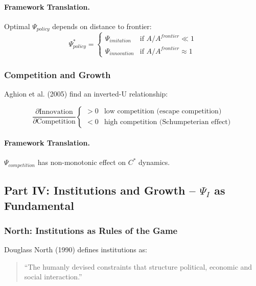 \paragraph{Framework Translation.}
Optimal $\Psi_{policy}$ depends on distance to frontier:
\begin{equation}
\Psi^*_{policy} = 
\begin{cases}
\Psi_{imitation} & \text{if } A/A^{frontier} \ll 1 \\
\Psi_{innovation} & \text{if } A/A^{frontier} \approx 1
\end{cases}
\end{equation}

\subsubsection{Competition and Growth}

Aghion et al. (2005) find an inverted-U relationship:

\begin{equation}
\frac{\partial \text{Innovation}}{\partial \text{Competition}} 
\begin{cases}
> 0 & \text{low competition (escape competition)} \\
< 0 & \text{high competition (Schumpeterian effect)}
\end{cases}
\end{equation}

\paragraph{Framework Translation.}
$\Psi_{competition}$ has non-monotonic effect on $C^*$ dynamics.

\subsection{Part IV: Institutions and Growth – $\Psi_I$ as Fundamental}

\subsubsection{North: Institutions as Rules of the Game}

Douglass North (1990) defines institutions as:
\begin{quote}
``The humanly devised constraints that structure political, economic and social interaction.''
\end{quote}

